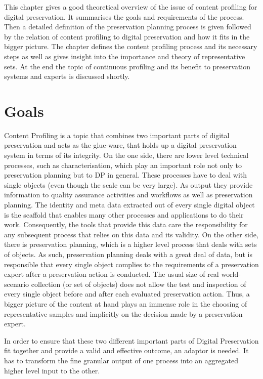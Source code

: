 This chapter gives a good theoretical overview of the issue of content profiling for digital preservation. It summarises the goals and requirements of the process. Then a detailed definition of the preservation planning process is given followed by the relation of content profiling to digital preservation and how it fits in the bigger picture. The chapter defines the content profiling process and its necessary steps as well as gives insight into the importance and theory of representative sets. At the end the topic of continuous profiling and its benefit to preservation systems and experts is discussed shortly.

\section {Goals}
\label{sec:goals}
Content Profiling is a topic that combines two important parts of digital preservation and acts as the glue-ware, that holds up a digital preservation system in terms of its integrity. On the one side, there are lower level technical processes, such as characterisation, which play an important role not only to preservation planning but to DP in general. These processes have to deal with single objects (even though the scale can be very large). As output they provide information to quality assurance activities and workflows as well as preservation planning. The identity and meta data extracted out of every single digital object is the scaffold that enables many other processes and applications to do their work. Consequently, the tools that provide this data care the responsibility for any subsequent process that relies on this data and its validity.
On the other side, there is preservation planning, which is a higher level process that deals with sets of objects. As such, preservation planning deals with a great deal of data, but is responsible that every single object complies to the requirements of a preservation expert after a preservation action is conducted. The usual size of real world-scenario collection (or set of objects) does not allow the test and inspection of every single object before and after each evaluated preservation action. Thus, a bigger picture of the content at hand plays an immense role in the choosing of representative samples and implicitly on the decision made by a preservation expert.

In order to ensure that these two different important parts of Digital Preservation fit together and provide a valid and effective outcome, an adaptor is needed. It has to transform the fine granular output of one process into an aggregated higher level input to the other.

